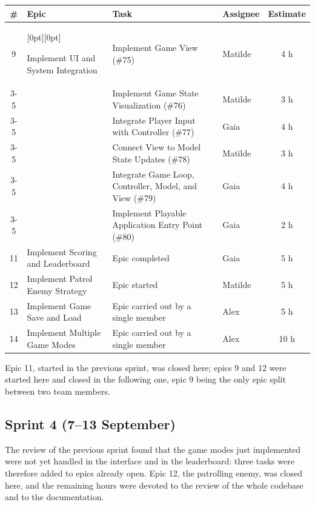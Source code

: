 \begin{center}
  \small
  \begin{tabular}{|c|p{3.5cm}|p{5.0cm}|p{2.3cm}|c|}
    \hline
    \textbf{\#} & \textbf{Epic} & \textbf{Task} & \textbf{Assignee} & \textbf{Estimate} \\
    \hline
    9 & \raisebox{0pt}[0pt][0pt]{\parbox[t]{3.5cm}{Implement UI and System Integration}} & Implement Game View (\#75) & Matilde & 4 h \\
    \cline{3-5}
      &  & Implement Game State Visualization (\#76) & Matilde & 3 h \\
    \cline{3-5}
      &  & Integrate Player Input with Controller (\#77) & Gaia & 4 h \\
    \cline{3-5}
      &  & Connect View to Model State Updates (\#78) & Matilde & 3 h \\
    \cline{3-5}
      &  & Integrate Game Loop, Controller, Model, and View (\#79) & Gaia & 4 h \\
    \cline{3-5}
      &  & Implement Playable Application Entry Point (\#80) & Gaia & 2 h \\
    \hline
    11 & Implement Scoring and Leaderboard & Epic completed & Gaia & 5 h \\
    \hline
    12 & Implement Patrol Enemy Strategy & Epic started & Matilde & 5 h \\
    \hline
    13 & Implement Game Save and Load & Epic carried out by a single member & Alex & 5 h \\
    \hline
    14 & Implement Multiple Game Modes & Epic carried out by a single member & Alex & 10 h \\
    \hline
  \end{tabular}
\end{center}

Epic 11, started in the previous sprint, was closed here; epics 9 and 12 were started here and closed in the
following one, epic 9 being the only epic split between two team members.

\subsection*{Sprint 4 (7--13 September)}

The review of the previous sprint found that the game modes just implemented were not yet handled in the interface and
in the leaderboard: three tasks were therefore added to epics already open. Epic 12, the patrolling enemy, was closed
here, and the remaining hours were devoted to the review of the whole codebase and to the documentation.

